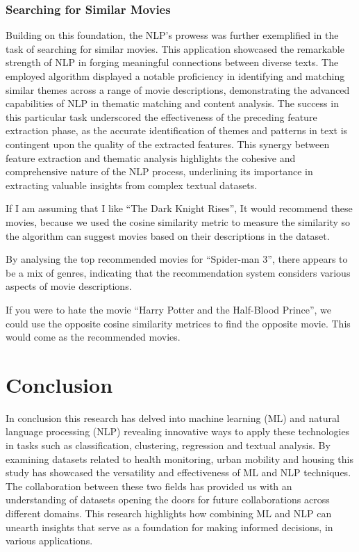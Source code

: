 \documentclass{article}
\begin{document}
\begin{multicols}{2}
\subsubsection{Searching for Similar Movies}

Building on this foundation, the NLP's prowess was further exemplified in the task of searching for similar movies. This application showcased the remarkable strength of NLP in forging meaningful connections between diverse texts. The employed algorithm displayed a notable proficiency in identifying and matching similar themes across a range of movie descriptions, demonstrating the advanced capabilities of NLP in thematic matching and content analysis. The success in this particular task underscored the effectiveness of the preceding feature extraction phase, as the accurate identification of themes and patterns in text is contingent upon the quality of the extracted features. This synergy between feature extraction and thematic analysis highlights the cohesive and comprehensive nature of the NLP process, underlining its importance in extracting valuable insights from complex textual datasets. 

If I am assuming that I like “The Dark Knight Rises”, It would recommend these movies, because we used the cosine similarity metric to measure the similarity so the algorithm can suggest movies based on their descriptions in the dataset. 

By analysing the top recommended movies for “Spider-man 3”, there appears to be a mix of genres, indicating that the recommendation system considers various aspects of movie descriptions.

If you were to hate the movie “Harry Potter and the Half-Blood Prince”, we could use the opposite cosine similarity metrices to find the opposite movie. This would come as the recommended movies. 

\section{Conclusion}

In conclusion this research has delved into machine learning (ML) and natural language processing (NLP) revealing innovative ways to apply these technologies in tasks such as classification, clustering, regression and textual analysis. By examining datasets related to health monitoring, urban mobility and housing this study has showcased the versatility and effectiveness of ML and NLP techniques. The collaboration between these two fields has provided us with an understanding of datasets opening the doors for future collaborations across different domains. This research highlights how combining ML and NLP can unearth insights that serve as a foundation for making informed decisions, in various applications.

\end{multicols}







\end{document}
